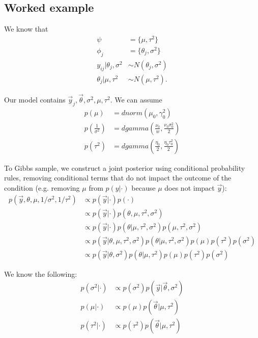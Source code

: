 \documentclass[titlepage, 12pt, leqno]{article}
\begin{document}
\subsection{Worked example}
We know that
\begin{align*}
    \psi &= \{\mu, \tau^{2}\}\\
    \phi_{j} &= \{\theta_{j}, \sigma^{2}\}\\
    y_{ij}|\theta_{j}, \sigma^{2} & \sim N(\theta_{j}, \sigma^{2})\\
    \theta_{j}|\mu, \tau^{2} & \sim N(\mu, \tau^{2}).
\end{align*}

Our model contains $\vec y_{j}, \vec \theta, \sigma^{2}, \mu, \tau^{2}$. We 
can assume
\begin{align*}
    p(\mu) &= dnorm(\mu_{0}, \gamma_{0}^{2})\\
    p\left(\frac{1}{\sigma^{2}}\right) &= dgamma\left(\frac{\nu_{0}}{w},
        \frac{\nu_{0}\sigma_{0}^{2}}{2}\right) \\
        p(\tau^{2}) &= dgamma\left(\frac{\eta_{0}}{2}, 
            \frac{\eta_{0}\tau_{0}^{2}}{2}\right)
\end{align*}

To Gibbs sample, we construct a joint posterior using conditional probability
rules, removing conditional terms that do not impact the outcome of the
condition (e.g. removing $\mu$ from $p(y|\cdot)$ because $\mu$ does not impact
$\vec y$):
\begin{align*}
    p(\vec y, \theta, \mu, 1/\sigma^{2}, 1/\tau^{2}) 
    &\propto  p(\vec y|\cdot)p(\cdot)\\
    &\propto  p(\vec y|\cdot)p(\theta, \mu, \tau^{2}, \sigma^{2})\\
    &\propto  p(\vec y|\cdot)p(\theta|\mu, \tau^{2}, \sigma^{2})p(\mu, \tau^{2}, 
    \sigma^{2})\\
    &\propto p(\vec y|\theta,\mu, \tau^{2}, \sigma^{2})p(\theta|\mu, \tau^{2},
    \sigma^{2})p(\mu)p(\tau^{2})p(\sigma^{2})\\
    &\propto p(\vec y|\theta,\sigma^{2})p(\theta|\mu,\tau^{2})p(\mu)p(\tau^{2})
    p(\sigma^{2})
\end{align*}

We know the following:
\begin{align*}
    p(\sigma^{2}|\cdot) &\propto p(\sigma^{2})p(\vec y|\vec \theta, \sigma^{2})\\
    p(\mu|\cdot) &\propto p(\mu)p(\vec \theta|\mu, \tau^{2})\\
    p(\tau^{2}|\cdot) &\propto p(\tau^{2})p(\vec \theta|\mu, \tau^{2})
\end{align*}
\end{document}
